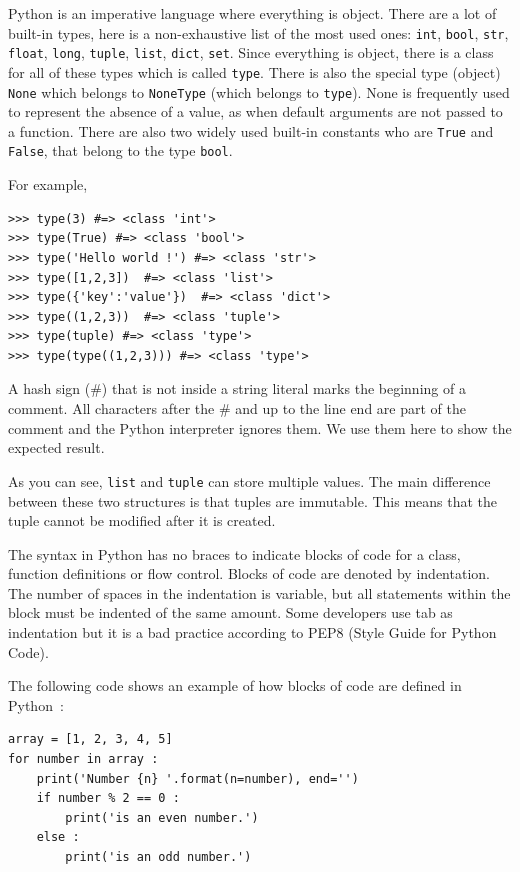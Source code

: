 \documentclass[a4paper,10pt]{article}
\begin{document}
Python is an imperative language where everything is object.
There are a lot of built-in types, here is a non-exhaustive list of the most used ones: \lstinline{int}, \lstinline{bool}, \lstinline{str}, \lstinline{float}, \lstinline{long}, \lstinline{tuple}, \lstinline{list}, \lstinline{dict}, \lstinline{set}.
Since everything is object, there is a class for all of these types which is called \lstinline{type}.
There is also the special type (object) \lstinline{None} which belongs to \lstinline{NoneType} (which belongs to \lstinline{type}).
None is frequently used to represent the absence of a value, as when default arguments are not passed to a function.
There are also two widely used built-in constants who are \lstinline{True} and \lstinline{False}, that belong to the type \lstinline{bool}.

For example,
\begin{lstlisting}
>>> type(3) #=> <class 'int'>
>>> type(True) #=> <class 'bool'>
>>> type('Hello world !') #=> <class 'str'>
>>> type([1,2,3])  #=> <class 'list'>
>>> type({'key':'value'})  #=> <class 'dict'>
>>> type((1,2,3))  #=> <class 'tuple'>
>>> type(tuple) #=> <class 'type'>
>>> type(type((1,2,3))) #=> <class 'type'>
\end{lstlisting}

A hash sign (\#) that is not inside a string literal marks the beginning of a comment.
All characters after the \# and up to the line end are part of the comment and the Python interpreter ignores them.
We use them here to show the expected result.

As you can see, \lstinline|list| and \lstinline|tuple| can store multiple values.
The main difference between these two structures is that tuples are immutable.
This means that the tuple cannot be modified after it is created.

The syntax in Python has no braces to indicate blocks of code for a class, function definitions or flow control.
Blocks of code are denoted by indentation.
The number of spaces in the indentation is variable, but all statements within the block must be indented of the same amount.
Some developers use tab as indentation but it is a bad practice according to PEP8 (Style Guide for Python Code).

The following code shows an example of how blocks of code are defined in \mbox{Python :}

\begin{lstlisting}
array = [1, 2, 3, 4, 5]
for number in array :
    print('Number {n} '.format(n=number), end='')
    if number % 2 == 0 :
        print('is an even number.')
    else :
        print('is an odd number.')
\end{lstlisting}
\end{document}
